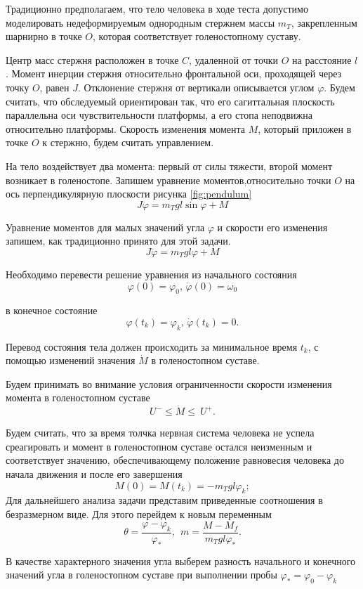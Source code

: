 \documentclass[a4paper,12pt, openany]{book}
\theoremstyle{plain} %
\theoremstyle{definition} %
\theoremstyle{remark} %
\numberwithin{equation}{chapter}
\begin{document}
{Традиционно предполагаем, что тело человека в ходе теста допустимо
моделировать недеформируемым однородным стержнем массы $m_T$,
закрепленным шарнирно в точке $O$, которая соответствует
голеностопному суставу.

Центр масс стержня расположен в точке $C$, удаленной от точки $O$
на расстояние $l$. Момент инерции стержня относительно фронтальной
оси, проходящей через точку $O$, равен $J$. Отклонение стержня от
вертикали описывается углом $\varphi$. Будем считать, что обследуемый
ориентирован так, что его сагиттальная плоскость параллельна оси
чувствительности платформы, а его стопа неподвижна относительно
платформы. Скорость изменения момента $M$, который приложен в точке $O$ к стержню,
будем считать управлением.

На тело воздействует два момента: первый от силы тяжести, второй момент возникает в голеностопе.
Запишем уравнение моментов,относительно точки $O$ на ось перпендикулярную плоскости рисунка \ref{fig:pendulum}
\[
    J\ddot{\varphi}= m_Tgl\sin\varphi+M
\]

Уравнение моментов для малых значений угла $\varphi$ и
скорости его изменения запишем, как традиционно принято для этой задачи.
\[
    J\ddot{\varphi}= m_Tgl\varphi+M
\]

Необходимо перевести решение уравнения из начального состояния
\[
    \varphi(0)=\varphi_0, \,\dot{\varphi}(0)=\omega_0
\]

в конечное состояние
\[
    \varphi(t_k)=\varphi_k,\, \dot{\varphi}(t_k)=0.
\]

Перевод состояния тела должен происходить за минимальное
время $t_k$, с помощью изменений значения $\dot{M}$ в
голеностопном суставе.

Будем принимать во внимание условия ограниченности скорости изменения
момента в голеностопном суставе
\[
    U^-\leqslant\dot{M}\leqslant\ U^+.
\]

Будем считать, что за время толчка нервная система человека
не успела среагировать и момент в голеностопном суставе остался
неизменным и соответствует значению, обеспечивающему положение
равновесия человека до начала движения и после его завершения
\[
    M(0)=M\left(t_k\right)=-m_Tgl\varphi_k;
\]
Для дальнейшего анализа задачи представим приведенные
соотношения в безразмерном виде. Для этого перейдем
к новым переменным
\[
    \theta=\frac{\varphi-\varphi_k}{\varphi_\ast},\ \ m=\frac{M-M_f}{m_Tgl\varphi_\ast}.
\]

В качестве характерного значения угла выберем разность
начального и конечного значений угла в голеностопном
суставе при выполнении пробы $\varphi_\ast=\varphi_0-\varphi_k$

}
\end{document}
